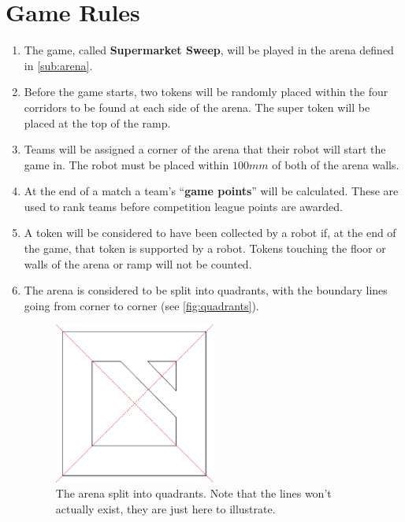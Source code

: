 \section {Game Rules}
\label{game-rules}

\begin{enumerate}
\item The game, called \textbf{Supermarket Sweep}, will be played in the arena defined in \autoref{sub:arena}.
\item Before the game starts, two tokens will be randomly placed within the four corridors to be found at each side of the arena.  The super token will be placed at the top of the ramp.
\item Teams will be assigned a corner of the arena that their robot will start the game in.
 The robot must be placed within $100mm$ of both of the arena walls.
\item At the end of a match a team's ``\textbf{game points}'' will be calculated.
 These are used to rank teams before competition league points are awarded.
\item A token will be considered to have been collected by a robot if, at the end of the game, that token is supported by a robot.
 Tokens touching the floor or walls of the arena or ramp will not be counted.

\item The arena is considered to be split into quadrants, with the boundary lines going from corner to corner (see \autoref{fig:quadrants}).

\begin{figure}
\begin{center}
  \includegraphics[keepaspectratio, clip, width=0.5\textwidth]{./images/quadrants.pdf}
  \caption{\label{fig:quadrants}The arena split into quadrants.
           Note that the lines won't actually exist, they are just here to illustrate.}
\end{center}
\end{figure}


\end{enumerate}
